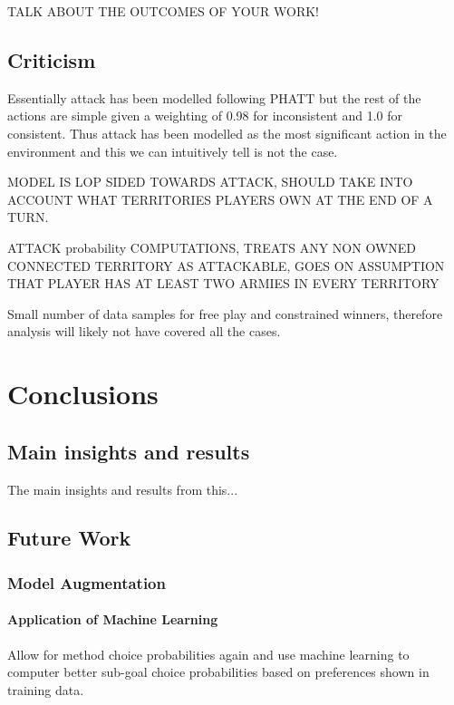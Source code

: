 \documentclass[parskip]{cs4rep}
\begin{document}
TALK ABOUT THE OUTCOMES OF YOUR WORK!

\section{Criticism}

Essentially attack has been modelled following PHATT but the rest of the actions are simple given a weighting of 0.98 for inconsistent and 1.0 for consistent. Thus attack has been modelled as the most significant action in the environment and this we can intuitively tell is not the case.

MODEL IS LOP SIDED TOWARDS ATTACK, SHOULD TAKE INTO ACCOUNT WHAT TERRITORIES PLAYERS OWN AT THE END OF A TURN.

ATTACK probability COMPUTATIONS, TREATS ANY NON OWNED CONNECTED TERRITORY AS ATTACKABLE, GOES ON ASSUMPTION THAT PLAYER HAS AT LEAST TWO ARMIES IN EVERY TERRITORY

Small number of data samples for free play and constrained winners, therefore analysis will likely not have covered all the cases.

\chapter{Conclusions}

\section{Main insights and results}

The main insights and results from this...

\section{Future Work}

\subsection{Model Augmentation}

\subsubsection{Application of Machine Learning}

Allow for method choice probabilities again and use machine learning to computer better sub-goal choice probabilities based on preferences shown in training data.
\end{document}
